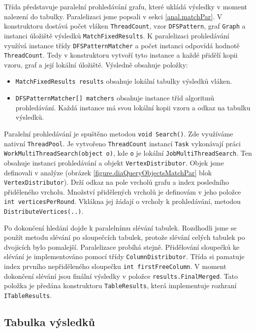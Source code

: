 Třída představuje paralelní prohledávání grafu, které ukládá výsledky v moment nalezení do tabulky.
Paralelizaci jsme popsali v sekci \ref{anal.matchPar}.
V konstruktoru dostává počet vláken \texttt{ThreadCount}, vzor \texttt{DFSPattern}, graf \texttt{Graph} a instanci úložiště výsledků \texttt{MatchFixedResults}.
K paralelizaci prohledávání využívá instance třídy \texttt{DFSPatternMatcher} a počet instanci odpovídá hodnotě \texttt{ThreadCount}.
Tedy v konstruktoru vytvoří tyto instance a každé přidělí kopii vzoru, graf a její lokální úložiště.
Výsledně obsahuje položky:
\begin{itemize}
\item \texttt{MatchFixedResults results} obsahuje lokální tabulky výsledků vláken.
\item \texttt{DFSPatternMatcher[] matchers} obsahuje instance tříd algoritmů prohledávání.
Každá instance má svou lokální kopii vzoru a odkaz na tabulku výsledků.
\end{itemize}
Paralelní prohledávání je spuštěno metodou \texttt{void Search()}.
Zde využíváme nativní \texttt{ThreadPool}.
Je vytvořeno \texttt{ThreadCount} instancí \texttt{Task} vykonávají práci \texttt{WorkMultiThreadSearch(object o)}, kde \texttt{o} je lokální \texttt{JobMultiThreadSearch}.
Ten obsahuje instanci prohledávání a objekt \texttt{VertexDistributor}.
Objek jsme definovali v analýze (obrázek \ref{figure.diaQueryObjectsMatchPar} blok \texttt{VertexDistributor}).
Drží odkaz na pole vrcholů grafu a index posledního přiděleného vrcholu.
Množství přidělených vrcholů je definovám v jeho položce \texttt{int verticesPerRound}.
Vklákna jej žádají o vrcholy k prohledávání, metodou \texttt{DistributeVertices(..)}.

Po dokončení hledání dojde k paralelnímu slévání tabulek.
Rozdhodli jsme se použít metodu slévání po sloupečcích tabulek, protože slévání celých tabulek po dvojicích bylo pomalejší.
Paralelizace probíhá stejně.
Přidělování sloupečků ke slévání je implementováno pomocí třídy \texttt{ColumnDistributor}.  
Třída si pamatuje index prvního nepřiděleného sloupečku \texttt{int firstFreeColumn}.
V moment dokončení slévání jsou finální výsledky v položce \texttt{results.FinalMerged}.
Tato položka je předána konstruktoru \texttt{TableResults}, která implementuje rozhraní \texttt{ITableResults}.

\subsection{Tabulka výsledků}

